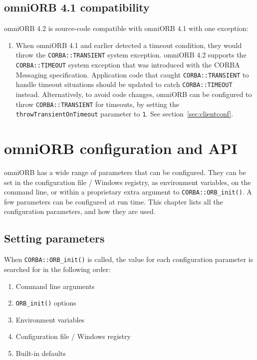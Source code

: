 \documentclass[11pt,twoside,a4paper]{book}
\newcommand{\code}[1]{\texttt{#1}}
\newcommand{\op}[1]{\texttt{#1()}}
\newcommand{\dsc}{\discretionary{}{}{}}
\begin{document}
\section{omniORB 4.1 compatibility}

omniORB 4.2 is source-code compatible with omniORB 4.1 with one
exception:

\begin{enumerate}

\item When omniORB 4.1 and earlier detected a timeout condition, they
  would throw the \code{CORBA::TRANSIENT} system exception. omniORB
  4.2 supports the \code{CORBA::TIMEOUT} system exception that was
  introduced with the CORBA Messaging specification. Application code
  that caught \code{CORBA::TRANSIENT} to handle timeout situations
  should be updated to catch \code{CORBA::TIMEOUT}
  instead. Alternatively, to avoid code changes, omniORB can be
  configured to throw \code{CORBA::TRANSIENT} for timeouts, by setting
  the \code{throwTransient\dsc{}OnTimeout} parameter to \code{1}. See
  section~\ref{sec:clientconf}.

\end{enumerate}


\chapter{omniORB configuration and API}
\label{chap:config}

omniORB has a wide range of parameters that can be configured. They
can be set in the configuration file / Windows registry, as
environment variables, on the command line, or within a proprietary
extra argument to \op{CORBA::ORB\_init}. A few parameters can be
configured at run time. This chapter lists all the configuration
parameters, and how they are used.

\section{Setting parameters}

When \op{CORBA::ORB\_init} is called, the value for each configuration
parameter is searched for in the following order:

\begin{enumerate}

\item Command line arguments
\item \op{ORB\_init} options
\item Environment variables
\item Configuration file / Windows registry
\item Built-in defaults

\end{enumerate}
\end{document}
